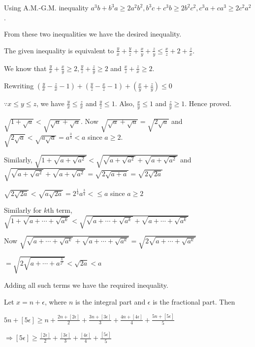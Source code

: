   Using A.M.-G.M. inequality $a^3b + b^3a\geq 2a^2b^2, b^3c + c^3b\geq 2b^2c^2, c^3a + ca^3\geq 2c^2a^2$.

  From these two inequalities we have the desired inequality.
\item The given inequality is equivalent to $\frac{y}{x} + \frac{y}{z} + \frac{x}{y} + \frac{z}{y}\leq
  \frac{x}{z} + 2 + \frac{z}{x}$.

  We know that $\frac{y}{x} + \frac{x}{y}\geq 2, \frac{y}{z} + \frac{z}{y}\geq 2$ and $\frac{x}{z} +
  \frac{z}{x}\geq 2$.

  Rewriting $\left(\frac{y}{x} - \frac{z}{x} - 1\right) + \left(\frac{y}{z} - \frac{x}{z} - 1\right) +
  \left(\frac{x}{y} + \frac{z}{y}\right)\leq 0$

  $\because x\leq y\leq z$, we have $\frac{y}{x}\leq \frac{z}{x}$ and $\frac{y}{z} \leq 1$. Also,
  $\frac{x}{y}\leq 1$ and $\frac{z}{y}\geq 1$. Hence proved.
\item $\sqrt{1 + \sqrt{a}} < \sqrt{\sqrt{a} + \sqrt{a}}$. Now $\sqrt{\sqrt{a} + \sqrt{a}} =
  \sqrt{2\sqrt{a}}$ and $\sqrt{2\sqrt{a}} < \sqrt{a\sqrt{a}} = a^{\frac{3}{4}} < a$ since $a\geq 2$.

  Similarly, $\sqrt{1 + \sqrt{a + \sqrt{a^2}}} < \sqrt{\sqrt{a + \sqrt{a^2}} + \sqrt{a + \sqrt{a^2}}}$
  and $\sqrt{\sqrt{a + \sqrt{a^2}} + \sqrt{a + \sqrt{a^2}}} = \sqrt{2\sqrt{a + a}} = \sqrt{2\sqrt{2a}}$

  $\sqrt{2\sqrt{2a}} < \sqrt{a\sqrt{2a}} = 2^{\frac{1}{4}}a^{\frac{3}{4}} <\leq a$ since $a\geq 2$

  Similarly for $k$th term, $\sqrt{1 + \sqrt{a + \cdots + \sqrt{a^k}}} < \sqrt{\sqrt{a + \cdots +
      \sqrt{a^k}} + \sqrt{a + \cdots + \sqrt{a^k}}}$

  Now $\sqrt{\sqrt{a + \cdots + \sqrt{a^k}} + \sqrt{a + \cdots + \sqrt{a^k}}} = \sqrt{2\sqrt{a + \cdots +
      \sqrt{a^k}}}$

  $=\sqrt{2\sqrt{a + \cdots + a^{\frac{k}{2^k}}}} < \sqrt{2a} < a$

  Adding all such terms we have the required inequality.
\item Let $x = n + \epsilon$, where $n$ is the integral part and $\epsilon$ is the fractional part. Then

  $5n + [5\epsilon]\geq n + \frac{2n + [2\epsilon]}{2} + \frac{3n + [3\epsilon]}{3} + \frac{4n +
  [4\epsilon]}{4} + \frac{5n + [5\epsilon]}{5}$

  $\Rightarrow [5\epsilon]\geq \frac{[2\epsilon]}{2} + \frac{[3\epsilon]}{3} + \frac{[4\epsilon]}{4} +
  \frac{[5\epsilon]}{5}$

